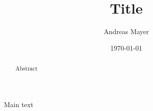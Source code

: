 \documentclass[rmp]{revtex4}
\begin{document}
\title{Title}
\author{Andreas Mayer} 
\address{}
\date{\today}

\begin{abstract}
    Abstract
\end{abstract}

\maketitle


Main text
\end{document}
